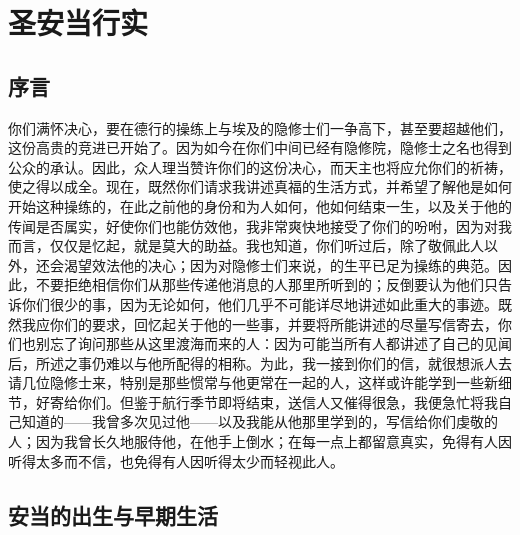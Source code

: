 
\chapter{圣安当行实}


\par


\section{序言}

你们满怀决心，要在德行的操练上与埃及的隐修士们一争高下，甚至要超越他们，这份高贵的竞进已开始了。因为如今在你们中间已经有隐修院，隐修士之名也得到公众的承认。因此，众人理当赞许你们的这份决心，而天主也将应允你们的祈祷，使之得以成全。现在，既然你们请求我讲述真福的生活方式，并希望了解他是如何开始这种操练的，在此之前他的身份和为人如何，他如何结束一生，以及关于他的传闻是否属实，好使你们也能仿效他，我非常爽快地接受了你们的吩咐，因为对我而言，仅仅是忆起，就是莫大的助益。我也知道，你们听过后，除了敬佩此人以外，还会渴望效法他的决心；因为对隐修士们来说，的生平已足为操练的典范。因此，不要拒绝相信你们从那些传递他消息的人那里所听到的；反倒要认为他们只告诉你们很少的事，因为无论如何，他们几乎不可能详尽地讲述如此重大的事迹。既然我应你们的要求，回忆起关于他的一些事，并要将所能讲述的尽量写信寄去，你们也别忘了询问那些从这里渡海而来的人：因为可能当所有人都讲述了自己的见闻后，所述之事仍难以与他所配得的相称。为此，我一接到你们的信，就很想派人去请几位隐修士来，特别是那些惯常与他更常在一起的人，这样或许能学到一些新细节，好寄给你们。但鉴于航行季节即将结束，送信人又催得很急，我便急忙将我自己知道的——我曾多次见过他——以及我能从他那里学到的，写信给你们虔敬的人；因为我曾长久地服侍他，在他手上倒水；在每一点上都留意真实，免得有人因听得太多而不信，也免得有人因听得太少而轻视此人。\par


\section{安当的出生与早期生活}

